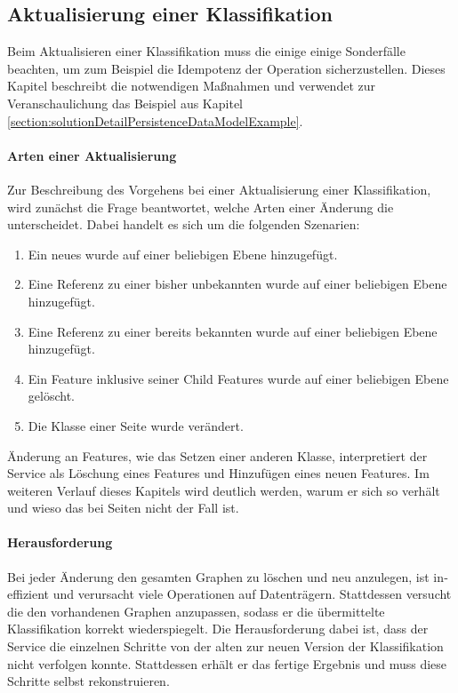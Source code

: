 \subsection{Aktualisierung einer Klassifikation}
    \label{section:solutionDetailsClassificationStorageAPIUpdatePage}
    Beim Aktualisieren einer Klassifikation muss die {\classificationStorageAPI}
    einige einige Sonderfälle beachten,
    um zum Beispiel die Idempotenz der Operation sicherzustellen.
    Dieses Kapitel beschreibt die notwendigen Maßnahmen und verwendet
    zur Veranschaulichung das Beispiel
    aus Kapitel \ref{section:solutionDetailPersistenceDataModelExample}.

    \paragraph{Arten einer Aktualisierung}
    Zur Beschreibung des Vorgehens bei einer Aktualisierung einer Klassifikation,
    wird zunächst die Frage beantwortet, welche Arten einer Änderung
    die {\classificationStorageAPI} unterscheidet.
    Dabei handelt es sich um die folgenden Szenarien:

    \begin{enumerate}
        \item Ein neues {\contentFeature} wurde auf einer beliebigen Ebene hinzugefügt.
        \item Eine Referenz zu einer bisher unbekannten {\resource} wurde auf einer beliebigen Ebene hinzugefügt.
        \item Eine Referenz zu einer bereits bekannten {\resource} wurde auf einer beliebigen Ebene hinzugefügt.
        \item Ein Feature inklusive seiner Child Features wurde auf einer beliebigen Ebene gelöscht.
        \item Die Klasse einer Seite wurde verändert.
    \end{enumerate}

    Änderung an Features, wie das Setzen einer anderen Klasse,
    interpretiert der Service als Löschung eines Features und Hinzufügen eines neuen Features.
    Im weiteren Verlauf dieses Kapitels wird deutlich werden,
    warum er sich so verhält und wieso das bei Seiten nicht der Fall ist.

    \paragraph{Herausforderung}
    Bei jeder Änderung den gesamten Graphen zu löschen und neu anzulegen,
    ist in­ef­fi­zi­ent und verursacht viele Operationen auf Datenträgern.
    Stattdessen versucht die {\classificationStorageAPI} den vorhandenen Graphen anzupassen,
    sodass er die übermittelte Klassifikation korrekt wiederspiegelt.
    Die Herausforderung dabei ist, dass der Service
    die einzelnen Schritte von der alten zur neuen Version der Klassifikation nicht verfolgen konnte.
    Stattdessen erhält er das fertige Ergebnis und muss diese Schritte selbst rekonstruieren.

